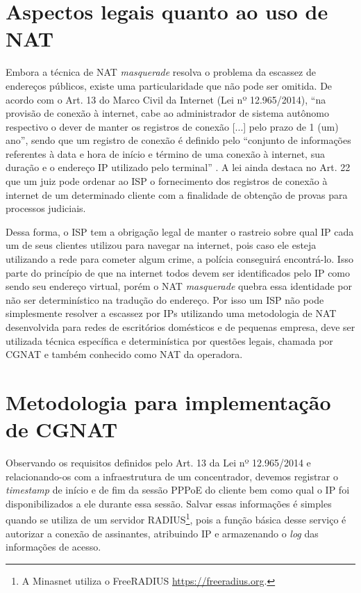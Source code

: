 \section{Aspectos legais quanto ao uso de NAT}

   Embora a técnica de NAT \textit{masquerade} resolva o problema da escassez de endereços públicos, existe uma particularidade que não pode ser omitida. De acordo com o Art. 13 do Marco Civil da Internet (Lei nº 12.965/2014), ``na provisão de conexão à internet, cabe ao administrador de sistema autônomo respectivo o dever de manter os registros de conexão [...] pelo prazo de 1 (um) ano'', sendo que um registro de conexão é definido pelo ``conjunto de informações referentes à data e hora de início e término de uma conexão à internet, sua duração e o endereço IP utilizado pelo terminal'' \cite{lei12965}. A lei ainda destaca no Art. 22 que um juiz pode ordenar ao ISP o fornecimento dos registros de conexão à internet de um determinado cliente com a finalidade de obtenção de provas para processos judiciais.
   
   Dessa forma, o ISP tem a obrigação legal de manter o rastreio sobre qual IP cada um de seus clientes utilizou para navegar na internet, pois caso ele esteja utilizando a rede para cometer algum crime, a polícia conseguirá encontrá-lo. Isso parte do princípio de que na internet todos devem ser identificados pelo IP como sendo seu endereço virtual, porém o NAT \textit{masquerade} quebra essa identidade por não ser determinístico na tradução do endereço. Por isso um ISP não pode simplesmente resolver a escassez por IPs utilizando uma metodologia de NAT desenvolvida para redes de escritórios domésticos e de pequenas empresa, deve ser utilizada técnica específica e determinística por questões legais, chamada por CGNAT e também conhecido como NAT da operadora.

\section{Metodologia para implementação de CGNAT}

   Observando os requisitos definidos pelo Art. 13 da Lei nº 12.965/2014 e relacionando-os com a infraestrutura de um concentrador, devemos registrar o \textit{timestamp} de início e de fim da sessão PPPoE do cliente bem como qual o IP foi disponibilizados a ele durante essa sessão. Salvar essas informações é simples quando se utiliza de um servidor RADIUS\footnote{A Minasnet utiliza o FreeRADIUS \url{https://freeradius.org}.}, pois a função básica desse serviço é autorizar a conexão de assinantes, atribuindo IP e armazenando o \textit{log} das informações de acesso.

